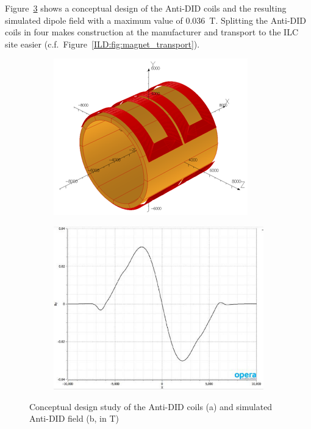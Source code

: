  Figure~\ref{ILD:fig:anti_did_design} shows a conceptual design of the Anti-DID coils and the resulting simulated dipole field with a maximum value of 0.036~T. Splitting the Anti-DID coils in four makes construction at the manufacturer and transport to the ILC site easier (c.f.~Figure~\ref{ILD:fig:magnet_transport}).

\begin{figure}[h!]
\begin{subfigure}{0.49\hsize} \includegraphics[width=\textwidth]{Integration/fig/Anti-DID.png}
\caption{ \label{ild:fig:anti_did_mechanics}}
 \end{subfigure}
\begin{subfigure}{0.49\hsize} \includegraphics[width=\textwidth]{Integration/fig/Anti-DID_Field.pdf}
\caption{  \label{ild:fig:anti-did-field}}
 \end{subfigure}
\caption{Conceptual design study of the Anti-DID coils (a) and simulated Anti-DID field (b, in T)~\cite{ild:bib:anti-did-design}}
\label{ILD:fig:anti_did_design}
\end{figure}

